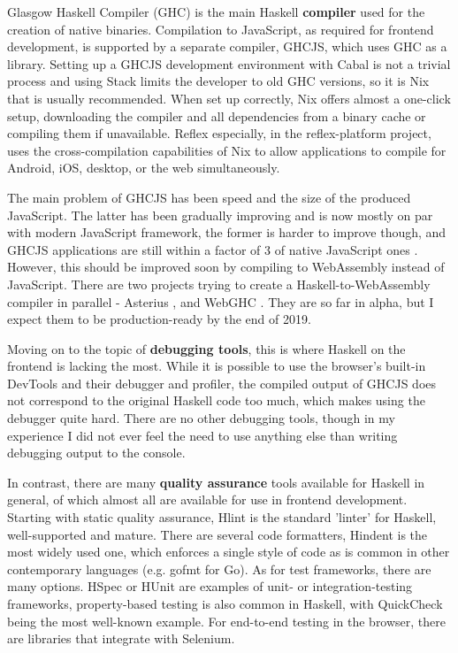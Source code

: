 \documentclass[english,odsaz]{fitthesis}
\begin{document}
Glasgow Haskell Compiler (GHC) is the main Haskell \textbf{compiler} used for the
creation of native binaries. Compilation to JavaScript, as required for frontend
development, is supported by a separate compiler, GHCJS, which uses GHC as a
library. Setting up a GHCJS development environment with Cabal is not a trivial
process and using Stack limits the developer to old GHC versions, so it is Nix
that is usually recommended. When set up correctly, Nix offers almost a
one-click setup, downloading the compiler and all dependencies from a binary
cache or compiling them if unavailable. Reflex especially, in the
reflex-platform \cite{reflex-platform} project, uses the cross-compilation
capabilities of Nix to allow applications to compile for Android, iOS, desktop,
or the web simultaneously.

The main problem of GHCJS has been speed and the size of the produced
JavaScript. The latter has been gradually improving and is now mostly on par
with modern JavaScript framework, the former is harder to improve though, and
GHCJS applications are still within a factor of 3 of native JavaScript ones
\cite{nanda_bench}. However, this should be improved soon by compiling to
WebAssembly instead of JavaScript. There are two projects trying to create a
Haskell-to-WebAssembly compiler in parallel - Asterius \cite{asterius}, and WebGHC
\cite{webghc}. They are so far in alpha, but I expect them to be production-ready
by the end of 2019.

Moving on to the topic of \textbf{debugging tools}, this is where Haskell on the frontend
is lacking the most. While it is possible to use the browser's built-in DevTools
and their debugger and profiler, the compiled output of GHCJS does not
correspond to the original Haskell code too much, which makes using the debugger
quite hard. There are no other debugging tools, though in my experience I did
not ever feel the need to use anything else than writing debugging output to the
console.

In contrast, there are many \textbf{quality assurance} tools available for Haskell in
general, of which almost all are available for use in frontend
development. Starting with static quality assurance, Hlint is the standard
'linter' for Haskell, well-supported and mature. There are several code
formatters, Hindent is the most widely used one, which enforces a single style
of code as is common in other contemporary languages (e.g. gofmt for Go). As for
test frameworks, there are many options. HSpec or HUnit are examples of unit- or
integration-testing frameworks, property-based testing is also common in
Haskell, with QuickCheck \cite{claessen2011quickcheck} being the most well-known
example. For end-to-end testing in the browser, there are libraries that
integrate with Selenium.
\end{document}
